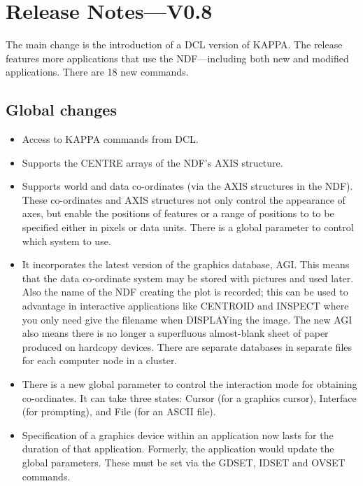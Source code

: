 {\newpage
\section{Release Notes---V0.8}
The main change is the introduction of a {\small DCL} version of {\small KAPPA}.
The release features more applications that use the NDF---including
both new and modified applications.  There are 18 new commands.

\subsection{Global changes}
\begin{itemize}
  \item Access to {\small KAPPA} commands from {\small DCL}.

  \item Supports the CENTRE arrays of the NDF's AXIS structure.

  \item Supports world and data co-ordinates (via the AXIS structures in
    the NDF).  These co-ordinates and AXIS structures not only control
    the appearance of axes, but enable the positions of features or a
    range of positions to to be specified either in pixels or data
    units.  There is a global parameter to control which system to use.

  \item It incorporates the latest version of the graphics database, AGI.
    This means that the data co-ordinate system may be stored with
    pictures and used later.  Also the name of the NDF creating the
    plot is recorded;  this can be used to advantage in interactive
    applications like CENTROID and INSPECT where you only need give
    the filename when DISPLAYing the image.  The new AGI also means
    there is no longer a superfluous almost-blank sheet of paper
    produced on hardcopy devices.  There are separate databases in
    separate files for each computer node in a cluster.

  \item There is a new global parameter to control the interaction mode
    for obtaining co-ordinates.  It can take three states: Cursor
    (for a graphics cursor), Interface (for prompting), and File
    (for an ASCII file).

   \item  Specification of a graphics device within an application
    now lasts for the duration of that application.  Formerly, the
    application would update the global parameters.  These must be set
    via the GDSET, IDSET and OVSET commands.


\end{itemize}}
